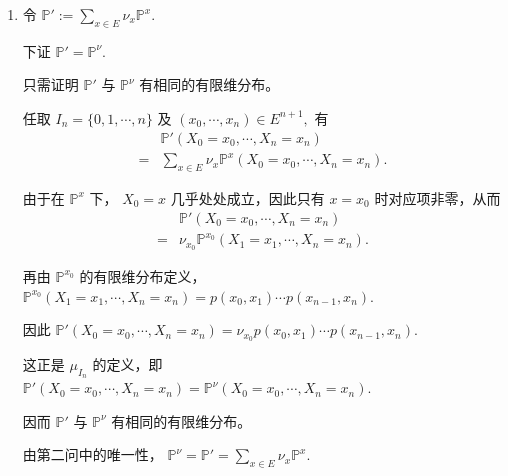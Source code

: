 \documentclass{ctexart}
\begin{document}
\begin{solution}
\begin{enumerate}
      即典则过程
      \( X = (X_n)_{n \geq 0} \)
      的有限维分布族恰为第一问构造的有限维分布族。

    \item 令
      \( \mathbb{P}' := \sum_{x \in E} \nu_x \mathbb{P}^x. \)

      下证
      \( \mathbb{P}' = \mathbb{P}^{\nu}. \)

      只需证明 \(\mathbb{P}'\) 与 \(\mathbb{P}^{\nu}\) 有相同的有限维分布。

      任取
      \( I_n = \{0,1,\cdots,n\} \)
      及
      \( (x_0,\cdots,x_n) \in E^{n+1}, \)
      有
      \begin{align*}
        &\mathbb{P}' (X_0=x_0,\cdots,X_n=x_n) \\
        ={}&
        \sum_{x \in E}
        \nu_x
        \mathbb{P}^x
        (X_0=x_0,\cdots,X_n=x_n).
      \end{align*}

      由于在 \(\mathbb{P}^x\) 下，
      \( X_0 = x \)
      几乎处处成立，因此只有 \(x=x_0\) 时对应项非零，从而
      \begin{align*}
        &\mathbb{P}'
        (X_0=x_0,\cdots,X_n=x_n)
        \\
        ={}&
        \nu_{x_0}
        \mathbb{P}^{x_0}
        (X_1=x_1,\cdots,X_n=x_n).
      \end{align*}

      再由 \(\mathbb{P}^{x_0}\) 的有限维分布定义，
      \( \mathbb{P}^{x_0} (X_1=x_1,\cdots,X_n=x_n) = p(x_0,x_1)\cdots p(x_{n-1},x_n). \)

      因此
      \( \mathbb{P}' (X_0=x_0,\cdots,X_n=x_n) = \nu_{x_0} p(x_0,x_1)\cdots p(x_{n-1},x_n). \)

      这正是 \(\mu_{I_n}\) 的定义，即
      \( \mathbb{P}' (X_0=x_0,\cdots,X_n=x_n) = \mathbb{P}^{\nu} (X_0=x_0,\cdots,X_n=x_n). \)

      因而 \(\mathbb{P}'\) 与 \(\mathbb{P}^{\nu}\) 有相同的有限维分布。

      由第二问中的唯一性，
      \( \mathbb{P}^{\nu} = \mathbb{P}' = \sum_{x \in E} \nu_x \mathbb{P}^x. \)
  \end{enumerate}
\end{solution}
\end{document}
